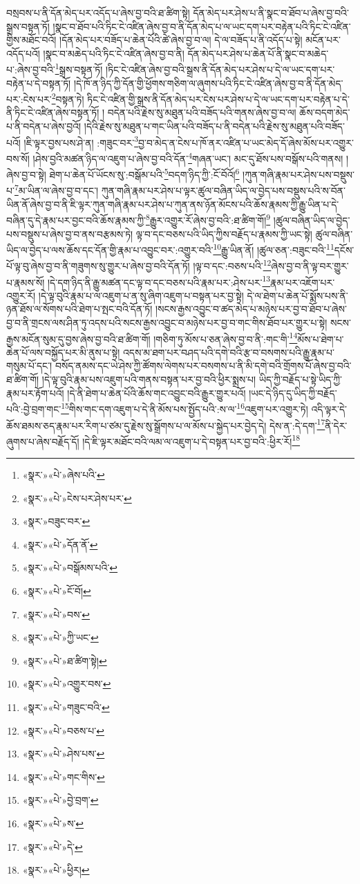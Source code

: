 བསྲབས་པ་ནི་དོན་མེད་པར་འདོད་པ་ཞེས་བྱ་བའི་ཐ་ཚིག་སྟེ། དོན་མེད་པར་ཤེས་པ་ནི་སྣང་བ་ཐོབ་པ་ཞེས་བྱ་བའི་སྒྲས་བསྟན་ཏོ། །སྣང་བ་ཐོབ་པའི་ཏིང་ངེ་འཛིན་ཞེས་བྱ་བ་ནི་དོན་མེད་པ་ལ་ཡང་དག་པར་བརྟེན་པའི་ཏིང་ངེ་འཛིན་གྱིས་མཐོང་བའོ། །དོན་མེད་པར་བཟོད་པ་ཆེན་པོའི་ཚེ་ཞེས་བྱ་བ་ལ། དེ་ལ་བཟོད་པ་ནི་འདོད་པ་སྟེ། མངོན་པར་འདོད་པའོ། །སྣང་བ་མཆེད་པའི་ཏིང་ངེ་འཛིན་ཞེས་བྱ་བ་ནི། དོན་མེད་པར་ཤེས་པ་ཆེན་པོ་ནི་སྣང་བ་མཆེད་པ་:ཞེས་བྱ་བའི་\footnote{«སྣར་»«པེ་»ཞེས་པའི་}སྒྲས་བསྟན་ཏོ། །ཏིང་ངེ་འཛིན་ཞེས་བྱ་བའི་སྒྲས་ནི་དོན་མེད་པར་ཤེས་པ་དེ་ལ་ཡང་དག་པར་བརྟེན་པ་དེ་བསྟན་ཏོ། །དེ་ཁོ་ན་ཉིད་ཀྱི་དོན་གྱི་ཕྱོགས་གཅིག་ལ་ཞུགས་པའི་ཏིང་ངེ་འཛིན་ཞེས་བྱ་བ་ནི་དོན་མེད་པར་:ངེས་པར་\footnote{«སྣར་»«པེ་»ངེས་པར་ཤེས་པར་}བསྟན་ཏེ། ཏིང་ངེ་འཛིན་གྱི་སྒྲས་ནི་དོན་མེད་པར་ངེས་པར་ཤེས་པ་དེ་ལ་ཡང་དག་པར་བརྟེན་པ་དེ་ནི་ཏིང་ངེ་འཛིན་ཞེས་བསྟན་ཏོ། །
བདེན་པའི་རྗེས་སུ་མཐུན་པའི་བཟོད་པའི་གནས་ཞེས་བྱ་བ་ལ། ཆོས་བདག་མེད་པ་ནི་བདེན་པ་ཞེས་བྱའོ། །དེའི་རྗེས་སུ་མཐུན་པ་གང་ཡིན་པའི་བཟོད་པ་ནི་བདེན་པའི་རྗེས་སུ་མཐུན་པའི་བཟོད་པའོ། །ཇི་ལྟར་བྱས་པས་ཤེ་ན། :གཟུང་བར་\footnote{«སྣར་»བཟུང་བར་}བྱ་བ་མེད་ན་ངེས་པ་ཁོ་ནར་འཛིན་པ་ཡང་མེད་དོ་ཞེས་མོས་པར་འགྱུར་བས་སོ། །ཤེས་བྱའི་མཚན་ཉིད་ལ་འཇུག་པ་ཞེས་བྱ་བའི་དོན་\footnote{«སྣར་»«པེ་»དོན་ནོ་}གཞན་ཡང་། མང་དུ་ཐོས་པས་བསྒོས་པའི་གནས། །ཞེས་བྱ་བ་སྟེ། ཐེག་པ་ཆེན་པོ་ཡོངས་སུ་:བསྒོམ་པའི་\footnote{«སྣར་»«པེ་»བསྒོམས་པའི་}བདག་ཉིད་ཀྱི་:ངོ་བོའོ།\footnote{«སྣར་»«པེ་»ངོ་བོ།} །ཀུན་གཞི་རྣམ་པར་ཤེས་པས་བསྡུས་པ་\footnote{«སྣར་»«པེ་»བས་}མ་ཡིན་ལ་ཞེས་བྱ་བ་དང་། ཀུན་གཞི་རྣམ་པར་ཤེས་པ་ལྟར་ཚུལ་བཞིན་ཡིད་ལ་བྱེད་པས་བསྡུས་པའི་ས་བོན་ཡིན་ནོ་ཞེས་བྱ་བ་ནི་ཇི་ལྟར་ཀུན་གཞི་རྣམ་པར་ཤེས་པ་ཀུན་ནས་ཉོན་མོངས་པའི་ཆོས་རྣམས་ཀྱི་རྒྱུ་ཡིན་པ་དེ་བཞིན་དུ་དེ་རྣམ་པར་བྱང་བའི་ཆོས་རྣམས་ཀྱི་\footnote{«སྣར་»«པེ་»ཀྱི་ཡང་}རྒྱུར་འགྱུར་རོ་ཞེས་བྱ་བའི་:ཐ་ཚིག་གོ།\footnote{«སྣར་»«པེ་»ཐ་ཚིག་སྟེ།} །ཚུལ་བཞིན་ཡིད་ལ་བྱེད་པས་བསྡུས་པ་ཞེས་བྱ་བ་ནས་བརྩམས་ཏེ། ལྟ་བ་དང་བཅས་པའི་ཡིད་ཀྱིས་བརྗོད་པ་རྣམས་ཀྱི་ཡང་སྟེ། ཚུལ་བཞིན་ཡིད་ལ་བྱེད་པ་ལས་ཆོས་དང་དོན་གྱི་རྣམ་པ་འབྱུང་བར་:འགྱུར་བའི་\footnote{«སྣར་»«པེ་»འགྱུར་བས་}རྒྱུ་ཡིན་ནོ། །ཚུལ་ཅན་:བཟུང་བའི་\footnote{«སྣར་»«པེ་»གཟུང་བའི་}དངོས་པོ་ལྟ་བུ་ཞེས་བྱ་བ་ནི་གཟུགས་སུ་གྱུར་པ་ཞེས་བྱ་བའི་དོན་ཏོ། །ལྟ་བ་དང་:བཅས་པའི་\footnote{«སྣར་»«པེ་»བཅས་པ་}ཞེས་བྱ་བ་ནི་ལྟ་བར་གྱུར་པ་རྣམས་སོ། །དེ་དག་ཉིད་ནི་རྒྱུ་མཚན་དང་ལྟ་བ་དང་བཅས་པའི་རྣམ་པར་:ཤེས་པར་\footnote{«སྣར་»«པེ་»ཤེས་པས་}རྣམ་པར་འཇོག་པར་འགྱུར་རོ། །དེ་ལྟ་བུའི་རྣམ་པ་ལ་འཇུག་པ་ན་སུ་ཞིག་འཇུག་པ་བསྟན་པར་བྱ་སྟེ། དེ་ལ་ཐེག་པ་ཆེན་པོ་སྨོས་པས་ནི་ཉན་ཐོས་ལ་སོགས་པའི་ཐེག་པ་སྤང་བའི་དོན་ཏོ། །སངས་རྒྱས་འབྱུང་བ་ཚད་མེད་པ་མཉེས་པར་བྱ་བ་ཐོབ་པ་ཞེས་བྱ་བ་ནི་གྲངས་ལས་ཤིན་ཏུ་འདས་པའི་སངས་རྒྱས་འབྱུང་བ་མཉེས་པར་བྱ་བ་གང་གིས་ཐོབ་པར་གྱུར་པ་སྟེ། སངས་རྒྱས་མངོན་སུམ་དུ་བྱས་ཞེས་བྱ་བའི་ཐ་ཚིག་གོ། །གཅིག་ཏུ་མོས་པ་ཅན་ཞེས་བྱ་བ་ནི་:གང་གི་\footnote{«སྣར་»«པེ་»གང་གིས་}མོས་པ་ཐེག་པ་ཆེན་པོ་ལས་བསྐྱོད་པར་མི་ནུས་པ་སྟེ། འདས་མ་ཐག་པར་བཤད་པའི་དགེ་བའི་རྩ་བ་བསགས་པའི་རྒྱུ་རྣམ་པ་གསུམ་པོ་དང་། བསོད་ནམས་དང་ཡེ་ཤེས་ཀྱི་ཚོགས་ལེགས་པར་བསགས་པ་ནི་མི་དགེ་བའི་གྲོགས་པོ་ཞེས་བྱ་བའི་ཐ་ཚིག་གོ། །དེ་ལྟ་བུའི་རྣམ་པས་འཇུག་པའི་གནས་བསྟན་པར་བྱ་བའི་ཕྱིར་སྨྲས་པ། ཡིད་ཀྱི་བརྗོད་པ་སྟེ་ཡིད་ཀྱི་རྣམ་པར་རྟོག་པའོ། །དེ་ནི་ཐེག་པ་ཆེན་པོའི་ཆོས་གང་འབྱུང་བའི་རྒྱུར་གྱུར་པའོ། །ཡང་དེ་ཉིད་དུ་ཡིད་ཀྱི་བརྗོད་པའི་:བྱེ་བྲག་གང་\footnote{«སྣར་»«པེ་»བྱེ་བྲག་}གིས་གང་དག་འཇུག་པ་དེ་ནི་མོས་པས་སྤྱོད་པའི་:ས་ལ་\footnote{«སྣར་»«པེ་»ས་}འཇུག་པར་འགྱུར་ཏེ། འདི་ལྟར་དེ་ཆོས་ཐམས་ཅད་རྣམ་པར་རིག་པ་ཙམ་དུ་རྗེས་སུ་སྒྲོགས་པ་ལ་མོས་པ་སྐྱེད་པར་བྱེད་དེ། དེས་ན་:དེ་དག་\footnote{«སྣར་»«པེ་»དེ་}ནི་དེར་ཞུགས་པ་ཞེས་བརྗོད་དོ། །དེ་ཇི་ལྟར་མཐོང་བའི་ལམ་ལ་འཇུག་པ་དེ་བསྟན་པར་བྱ་བའི་:ཕྱིར་རོ།\footnote{«སྣར་»«པེ་»ཕྱིར།} 